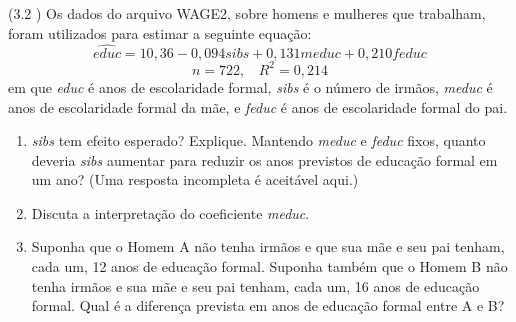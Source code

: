 \documentclass[12pt,letterpaper, onecolumn]{exam}
\begin{document}
\begin{questions}
    \question (3.2 \citep{wooldridge2010}) Os dados do arquivo WAGE2, sobre homens e mulheres que trabalham, foram utilizados para estimar a seguinte equação:\begin{equation*}
        \widehat{educ} = 10,36 - 0,094sibs + 0,131meduc + 0,210feduc
    \end{equation*} \begin{equation*}
        n = 722, \ \ \ \ R^2 = 0,214
    \end{equation*} em que \textit{educ} é anos de escolaridade formal, \textit{sibs} é o número de irmãos, \textit{meduc} é anos de escolaridade formal da mãe, e \textit{feduc} é anos de escolaridade formal do pai.
    \begin{enumerate} [label = (\alph*)]
        \item \textit{sibs} tem efeito esperado? Explique. Mantendo \textit{meduc} e \textit{feduc} fixos, quanto deveria \textit{sibs} aumentar para reduzir os anos previstos de educação formal em um ano? (Uma resposta incompleta é aceitável aqui.)
        \item Discuta a interpretação do coeficiente \textit{meduc}.
        \item Suponha que o Homem A não tenha irmãos e que sua mãe e seu pai tenham, cada um, 12 anos de educação formal. Suponha também que o Homem B não tenha irmãos e sua mãe e seu pai tenham, cada um, 16 anos de educação formal. Qual é a diferença prevista em anos de educação formal entre A e B?
    \end{enumerate}
\
\


\end{questions}
\end{document}
